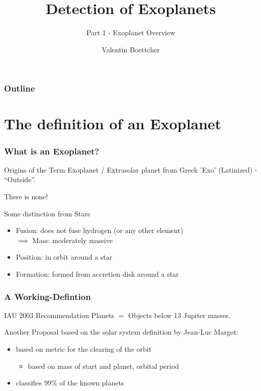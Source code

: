 \documentclass[presentation,t,aspectratio=169]{beamer}
\title{Detection of Exoplanets}
\subtitle{Part 1 - Exoplanet Overview}
\author{Valentin Boettcher}
\begin{document}
\begin{frame}
  \titlepage
\end{frame}

{  
  \begin{frame}[plain]
  \end{frame}
}

\begin{frame}
  \frametitle{Outline}
  \tableofcontents[pausesections]
\end{frame}

\section{The definition of an Exoplanet}
\begin{frame}
  \frametitle{What is an Exoplanet?}
  \begin{block}{Origins of the Term}
    Exoplanet / Extrasolar planet from Greek 'Exo' (Latinized)
    - ``Outside''.
  \end{block}
  \pause
  \begin{definition}
    There is none!
  \end{definition}
  \begin{block}{Some distinction from Stars}
    \begin{itemize}
    \item Fusion: does not fuse hydrogen (or any other element)
      \\ $\implies$ Mass: moderately massive
    \item Position: in orbit around a star
    \item Formation: formed from accretion disk around a star
    \end{itemize}    
  \end{block}
\end{frame}
\begin{frame}
  \frametitle{A Working-Defintion}
  \begin{block}{IAU 2003 Recommendation}
    Planets $=$ Objects below 13 Jupiter masses.
  \end{block}
  \pause
  Another Proposal based on the solar system definition by Jean-Luc Margot:
  \begin{itemize}
  \item based on metric for the clearing of the orbit
    \begin{itemize}
    \item based on mass of start and planet, orbital period
    \end{itemize}
  \item classifies 99\% of the known planets
  \end{itemize}
\end{frame}
\end{document}
